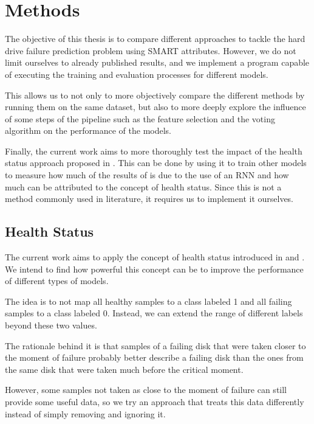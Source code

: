 \chapter{Methods}\label{chap:methods}

The objective of this thesis is to compare different approaches to tackle the hard drive failure prediction problem using SMART attributes.
However, we do not limit ourselves to already published results, and we implement a program capable of executing the training and evaluation processes for different models.

This allows us to not only to more objectively compare the different methods by running them on the same dataset, but also to more deeply explore the influence of some steps of the pipeline such as the feature selection and the voting algorithm on the performance of the models.

Finally, the current work aims to more thoroughly test the impact of the health status approach proposed in \cite{Xu16}.
This can be done by using it to train other models to measure how much of the results of \cite{Xu16} is due to the use of an RNN and how much can be attributed to the concept of health status.
Since this is not a method commonly used in literature, it requires us to implement it ourselves.

\section{Health Status}\label{sec:health_status}

The current work aims to apply the concept of health status introduced in \cite{Xu16} and \cite{Li14}.
We intend to find how powerful this concept can be to improve the performance of different types of models.

The idea is to not map all healthy samples to a class labeled 1 and all failing samples to a class labeled 0.
Instead, we can extend the range of different labels beyond these two values.

The rationale behind it is that samples of a failing disk that were taken closer to the moment of failure probably better describe a failing disk than the ones from the same disk that were taken much before the critical moment.

However, some samples not taken as close to the moment of failure can still provide some useful data, so we try an approach that treats this data differently instead of simply removing and ignoring it.

